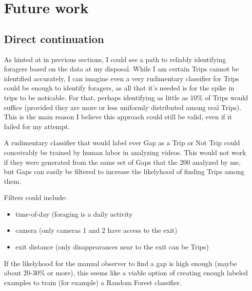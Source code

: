 
\chapter{Future work}  %

\ifpdf
    \graphicspath{{Chapters/Chapter6/Figs/Raster/}{Chapters/Chapter6/Figs/PDF/}{Chapters/Chapter6/Figs/}}
\else
    \graphicspath{{Chapters/Chapter6/Figs/Vector/}{Chapters/Chapter6/Figs/}}
\fi


\section{Direct continuation}

As hinted at in previous sections, I could see a path to reliably identifying foragers based on the data at my disposal. While I am certain Trips cannot be identified accurately, I can imagine even a very rudimentary classifier for Trips could be enough to identify foragers, as all that it's needed is for the spike in trips to be noticable. For that, perhaps identifying as little as 10\% of Trips would suffice (provided they are more or less uniformly distributed among real Trips). This is the main reason I believe this approach could still be valid, even if it failed for my attempt.

A rudimentary classifier that would label ever Gap as a Trip or Not Trip could conceivably be trained by human labor in analyzing videos. This would not work if they were generated from the same set of Gaps that the 200 analyzed by me, but Gaps can easily be filtered to increase the likelyhood of finding Trips among them.

Filters could include:
\begin{itemize}
 \item time-of-day (foraging is a daily activity
 \item camera (only cameras 1 and 2 have access to the exit)
 \item exit distance (only disappearances near to the exit can be Trips)
\end{itemize}

If the likelyhood for the manual observer to find a gap is high enough (maybe about 20-30\% or more), this seems like a viable option of creating enough labeled examples to train (for example) a Random Forest classifier.


